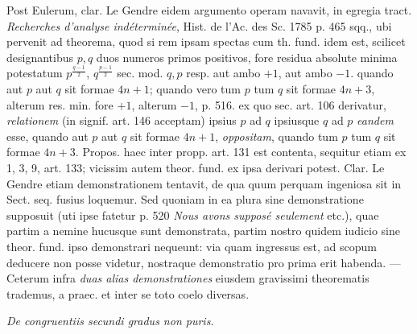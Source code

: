 Post Eulerum, clar. Le Gendre eidem argumento operam navavit, in egregia tract. \textit{Recherches d'analyse indéterminée}, Hist. de l'Ac. des Sc. 1785 p. 465 sqq., ubi pervenit ad theorema, quod si rem ipsam spectas cum th. fund. idem est, scilicet designantibus $p,q$ duos numeros primos positivos, fore residua absolute minima potestatum $p^{\frac{q-1}{2}}$, $q^{\frac{p-1}{2}}$ sec. mod. $q,p$ resp. aut ambo $+1$, aut ambo $-1$. quando aut $p$ aut $q$ sit formae $4n+1$; quando vero tum $p$ tum $q$ sit formae $4n+3$, alterum res. min. fore $+1$, alterum $-1$, p. 516. ex quo sec. art. 106 derivatur, \textit{relationem} (in signif. art. 146 acceptam) ipsius $p$ ad $q$ ipsiusque $q$ ad $p$ \textit{eandem} esse, quando aut $p$ aut $q$ sit formae $4n+1$, \textit{oppositam}, quando tum $p$ tum $q$ sit formae $4n+3$. Propos. haec inter propp. art. 131 est contenta, sequitur etiam ex 1, 3, 9, art. 133; vicissim autem theor. fund. ex ipsa derivari potest. Clar. Le Gendre etiam demonstrationem tentavit, de qua quum perquam ingeniosa sit in Sect. seq. fusius loquemur. Sed quoniam in ea plura sine demonstratione supposuit (uti ipse fatetur p. 520 \textit{Nous avons supposé seulement} etc.), quae partim a nemine hucusque sunt demonstrata, partim nostro quidem iudicio sine theor. fund. ipso demonstrari nequeunt: via quam ingressus est, ad scopum deducere non posse videtur, nostraque demonstratio pro prima erit habenda. --- Ceterum infra \textit{duas alias demonstrationes} eiusdem gravissimi theorematis trademus, a praec. et inter se toto coelo diversas.

\begin{center}
\textit{De congruentiis secundi gradus non puris.}
\end{center}

